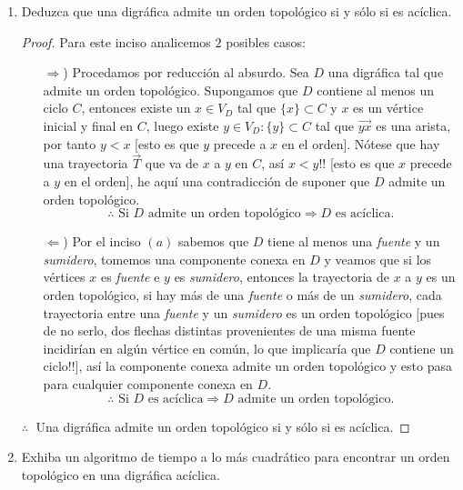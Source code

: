 \documentclass{article}
\begin{document}
\begin{enumerate}
\begin{enumerate}
\begin{proof}
      \hspace*{2cm} $\therefore\;$ Si $D$ es ac\'iclica tiene al menos una fuente y un sumidero.
    \end{proof}
  \item Deduzca que una digr\'afica admite un orden topol\'ogico si y s\'olo
    si es ac\'iclica.
    \begin{proof}
      Para este inciso analicemos $2$ posibles casos:
      \begin{itemize}
      \item[$\Rightarrow$)] Procedamos por reducci\'on al absurdo. Sea $D$ una
        digr\'afica tal que admite un orden topol\'ogico. Supongamos que $D$
        contiene al menos un ciclo $C$, entonces existe un $x \in V_D$ tal que
        $\{x\} \subset C$ y $x$ es un v\'ertice inicial y final en $C$, luego
        existe $y \in V_D : \{y\} \subset C$ tal que $\vec{yx}$ es una arista,
        por tanto $y < x$ [esto es que $y$ precede a $x$ en el orden]. N\'otese
        que hay una trayectoria $\vec{T}$ que va de $x$ a $y$ en $C$, as\'i
        $x < y$!! [esto es que $x$ precede a $y$ en el orden], he aqu\'i una
        contradicci\'on de suponer que $D$ admite un orden topol\'ogico.
        \[
        \therefore \text{ Si $D$ admite un orden topol\'ogico}
        \Rightarrow D \text{ es ac\'iclica.}
        \]
      \item[$\Leftarrow$)] Por el inciso $(a)$ sabemos que $D$ tiene al menos
        una \textit{fuente} y un \textit{sumidero}, tomemos una componente
        conexa en $D$ y veamos que si los v\'ertices $x$ es \textit{fuente}
        e $y$ es \textit{sumidero}, entonces la trayectoria de $x$ a $y$ es
        un orden topol\'ogico, si hay m\'as de una \textit{fuente} o m\'as de
        un \textit{sumidero}, cada trayectoria entre una \textit{fuente} y un
        \textit{sumidero} es un orden topol\'ogico [pues de no serlo, dos flechas
          distintas provenientes de una misma fuente incidir\'ian en alg\'un
          v\'ertice en com\'un, lo que implicar\'ia que $D$ contiene un ciclo!!],
        as\'i la componente conexa admite un orden topol\'ogico y esto pasa
        para cualquier componente conexa en $D$.
        \[
        \therefore \text{ Si $D$ es ac\'iclica}
        \Rightarrow D \text{ admite un orden topol\'ogico.}
        \]
      \end{itemize}
      \hspace*{1.3cm} $\therefore\;$ Una digr\'afica admite un orden
      topol\'ogico si y s\'olo si es ac\'iclica.
    \end{proof}
  \item Exhiba un algoritmo de tiempo a lo m\'as cuadr\'atico para encontrar
    un orden topol\'ogico en una digr\'afica ac\'iclica.
  \end{enumerate}
\end{enumerate}
\end{document}
